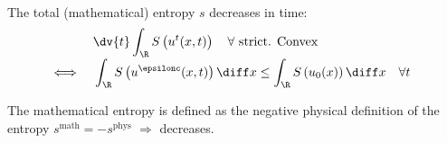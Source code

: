 \begin{lawbox}\nospacing
    \begin{law}\label{law:2nd_laws_of_themordynamics}\leavevmode\\
        The total (mathematical) entropy $s$ decreases in time:
        \begin{align}
          &&&\dv{t}\int_{\R}S \left(u^{t}(x,t)\right)\quad\forall\text{ strict. Convex}\\[-1\jot]
          &\iff&&\int_{\R}S \left(u^{\epsilonc}(x,t)\right)\diff x\leq
                 \int_{\R}S \left(u_{0}(x)\right)\diff x&&\forall t
        \end{align}
    \end{law}
\end{lawbox}
\begin{notebox}\nospacing
   The mathematical entropy is defined as the negative physical definition of the entropy $s^{\text{math}}=-s^{\text{phys}}$  $\Rightarrow$ decreases.
\end{notebox}



